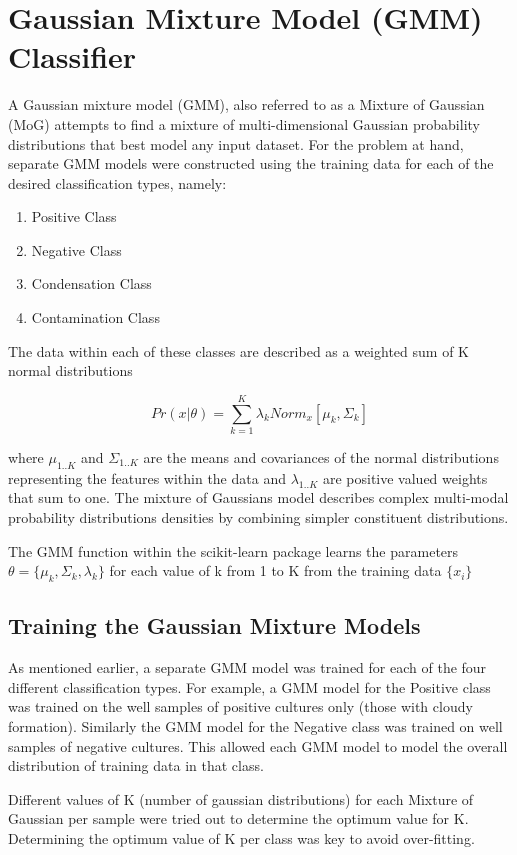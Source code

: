 \documentclass[a4paper,twoside,12pt]{report}
\begin{document}
\section{Gaussian Mixture Model (GMM) Classifier}
A Gaussian mixture model (GMM), also referred to as a Mixture of Gaussian (MoG) attempts to find a mixture of multi-dimensional Gaussian probability distributions that best model any input dataset.    For the problem at hand, separate GMM models were constructed using the training data for each of the desired classification types, namely: 
\begin{enumerate}
\item Positive Class
\item Negative Class
\item Condensation Class
\item Contamination Class
\end{enumerate}

The data within each of these classes are described as a weighted sum of K normal distributions

\[
Pr(x|\theta)=\sum_{k=1}^{K} \lambda_k  Norm_x[\mu_k,\Sigma_k]
\]

where \(\mu_{1..K}\) and \(\Sigma_{1..K}\) are the means and covariances of the normal distributions representing the features within the data and \(\lambda_{1..K}\) are positive valued weights that sum to one.  The mixture of Gaussians model describes complex multi-modal probability distributions densities by combining simpler constituent distributions. 

The GMM function within the scikit-learn package learns the parameters \( 
\theta = \{ \mu_k, \Sigma_k, \lambda_k \}
\)
for each value of k from 1 to K from the training data \( 
\{x_i\}
\)

\subsection {Training the Gaussian Mixture Models}

As mentioned earlier, a separate GMM model was trained for each of the four different classification types.  For example, a GMM model for the Positive class was trained on the well samples of positive cultures only (those with cloudy formation).   Similarly the GMM model for the Negative class was trained on well samples of negative cultures. 
This allowed each GMM model to model the overall distribution of training data in that class. 

Different values of K (number of gaussian distributions) for each Mixture of Gaussian per sample were tried out to determine the optimum value for K.       Determining the optimum value of K per class was key to avoid over-fitting. 
\end{document}
